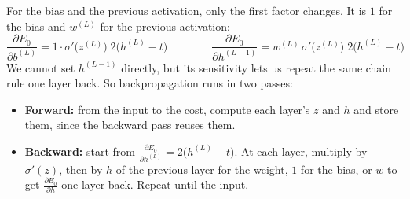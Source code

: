 \begin{keeptogether}
For the bias and the previous activation, only the first factor changes. It is $1$ for the bias and $w^{(L)}$ for the previous activation:
\[
\frac{\partial E_0}{\partial b^{(L)}} = 1\cdot \sigma'\big(z^{(L)}\big)\; 2\big(h^{(L)} - t\big)
\qquad\qquad
\frac{\partial E_0}{\partial h^{(L-1)}} = w^{(L)}\, \sigma'\big(z^{(L)}\big)\; 2\big(h^{(L)} - t\big)
\]
We cannot set $h^{(L-1)}$ directly, but its sensitivity lets us repeat the same chain rule one layer back. So backpropagation runs in two passes:
\begin{itemize}
  \item \textbf{Forward:} from the input to the cost, compute each layer's $z$ and $h$ and store them, since the backward pass reuses them.
  \item \textbf{Backward:} start from $\frac{\partial E_0}{\partial h^{(L)}} = 2\big(h^{(L)} - t\big)$. At each layer, multiply by $\sigma'(z)$, then by $h$ of the previous layer for the weight, $1$ for the bias, or $w$ to get $\frac{\partial E_0}{\partial h}$ one layer back. Repeat until the input.
\end{itemize}


\end{keeptogether}
